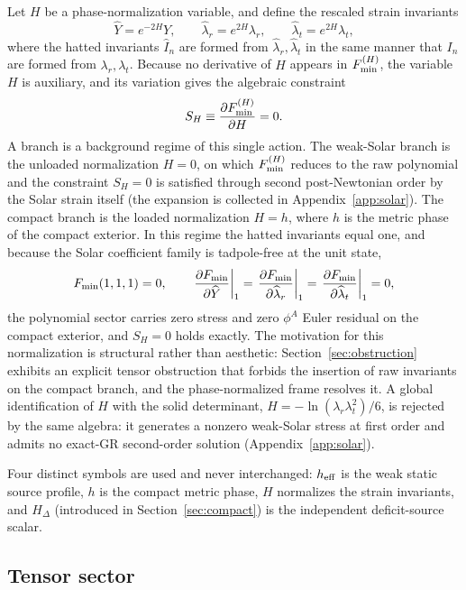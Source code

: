\documentclass[12pt,a4paper]{article}
\begin{document}
Let $H$ be a phase-normalization variable, and define the rescaled strain
invariants
\[
\widehat Y=e^{-2H}Y,\qquad
\widehat\lambda_r=e^{2H}\lambda_r,\qquad
\widehat\lambda_t=e^{2H}\lambda_t,
\]
where the hatted invariants $\widehat I_n$ are formed from
$\widehat\lambda_r,\widehat\lambda_t$ in the same manner that $I_n$ are formed
from $\lambda_r,\lambda_t$. Because no derivative of $H$ appears in
$F_{\rm min}^{(H)}$, the variable $H$ is auxiliary, and its variation gives the
algebraic constraint
\[
S_H\equiv\frac{\partial F_{\rm min}^{(H)}}{\partial H}=0 .
\]
A branch is a background regime of this single action. The weak-Solar branch
is the unloaded normalization $H=0$, on which $F_{\rm min}^{(H)}$ reduces to
the raw polynomial and the constraint $S_H=0$ is satisfied through second
post-Newtonian order by the Solar strain itself (the expansion is collected
in Appendix~\ref{app:solar}). The compact branch is the loaded normalization
$H=h$, where $h$ is the metric phase of the compact exterior. In this regime
the hatted invariants equal one, and because the Solar coefficient family is
tadpole-free at the unit state,
\[
F_{\rm min}(1,1,1)=0,\qquad
\left.\frac{\partial F_{\rm min}}{\partial\widehat Y}\right|_1=
\left.\frac{\partial F_{\rm min}}{\partial\widehat\lambda_r}\right|_1=
\left.\frac{\partial F_{\rm min}}{\partial\widehat\lambda_t}\right|_1=0,
\]
the polynomial sector carries zero stress and zero $\phi^A$ Euler residual on
the compact exterior, and $S_H=0$ holds exactly. The motivation for this
normalization is structural rather than aesthetic:
Section~\ref{sec:obstruction} exhibits an explicit tensor obstruction that
forbids the insertion of raw invariants on the compact branch, and the
phase-normalized frame resolves it. A global identification of $H$ with the solid determinant,
$H=-\ln(\lambda_r\lambda_t^2)/6$, is rejected by the same algebra: it
generates a nonzero weak-Solar stress at first order and admits no exact-GR
second-order solution (Appendix~\ref{app:solar}).

Four distinct symbols are used and never interchanged: $h_{\rm eff}$ is the
weak static source profile, $h$ is the compact metric phase, $H$ normalizes
the strain invariants, and $H_\Delta$ (introduced in
Section~\ref{sec:compact}) is the independent deficit-source scalar.

\subsection{Tensor sector}
\label{sec:tensor}
\end{document}
